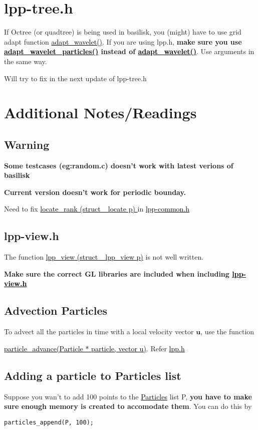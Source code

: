 \documentclass[a4paper,12pt]{article}
\newcommand{\fname}[1]{\textcolor{black}{\underline{#1}}}
\begin{document}
    \section{lpp-tree.h}
    If Octree (or quadtree) is being used in basilisk, you (might) have to use grid adapt function \fname{adapt\_wavelet()}. If you are using lpp.h, \textbf{make sure you use 
    \fname{adapt\_wavelet\_particles()} instead of \fname{adapt\_wavelet()}}. Use arguments in the  same way. 
    
    Will try to fix in the next update of lpp-tree.h
    
    \section{Additional Notes/Readings}
    \subsection{Warning}
    \textbf{Some testcases (eg:random.c) doesn't work with latest verions of basilisk}
    
    \textbf{Current version doesn't work for periodic bounday.}
    
    Need to fix
    \fname{locate\_rank (struct \_locate p) } in \fname{lpp-common.h}
    \subsection{lpp-view.h}
    The function \fname{lpp\_view (struct \_lpp\_view p)} is not well written.
    
    
    \textbf{Make sure the correct GL libraries are included when including \fname{lpp-view.h} }
    
    \subsection{Advection Particles}
    To advect all the particles in time with a local velocity vector $\mathbf{u}$, use the function
    
    
    \fname{particle\_advance(Particle * particle, vector u)}. 
    Refer \fname{lpp.h}
    
    
    \subsection{Adding a particle to Particles list}
    Suppose you wan't to add 100 points to the \fname{Particles} list P, \textbf{you have to make sure enough memory is created to accomodate them}. You can do this by
    \begin{lstlisting}[style=CStyle]
    particles_append(P, 100);
    \end{lstlisting}
    
\end{document}
